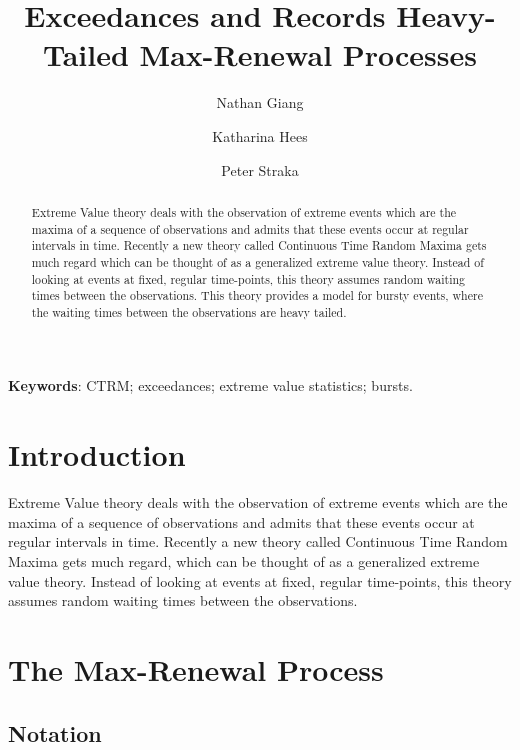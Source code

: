 \documentclass[12pt]{article}
\title{Exceedances and Records Heavy-Tailed Max-Renewal Processes}
\author{Nathan Giang \and Katharina Hees \and Peter Straka}
\newcommand{\1}{\mathbf 1}
\begin{document}
\maketitle

\begin{abstract}
Extreme Value theory deals with the observation of extreme events which are the maxima of a sequence of observations and admits that these events occur at regular intervals in time. Recently a new theory called Continuous Time Random Maxima gets much regard which can be thought of as a generalized extreme value theory. Instead of looking at events at fixed, regular time-points, this theory assumes random waiting times between the observations. This theory provides a model for bursty events, where the waiting times between the observations are heavy tailed.\\

\end{abstract}

{\bf Keywords}: CTRM; exceedances; extreme value statistics; bursts.


\setlength{\parindent}{0pt}

\section{Introduction}
Extreme Value theory deals with the observation of extreme events which are the maxima of a sequence of observations and admits that these events occur at regular intervals in time. Recently a new theory called Continuous Time Random Maxima gets much regard, which can be thought of as a generalized extreme value theory. Instead of looking at events at fixed, regular time-points, this theory assumes random waiting times between the observations.


\section{The Max-Renewal Process}

\subsection{Notation}
\end{document}
